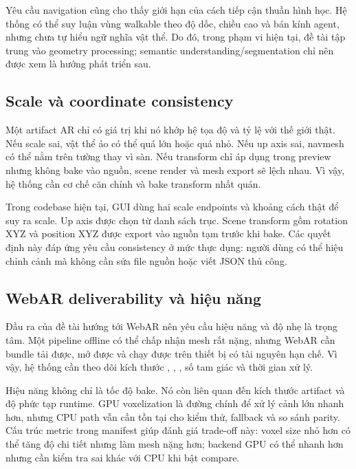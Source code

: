 Yêu cầu navigation cũng cho thấy giới hạn của cách tiếp cận thuần hình học. Hệ thống có thể suy luận vùng walkable theo độ dốc, chiều cao và bán kính agent, nhưng chưa tự hiểu ngữ nghĩa vật thể. Do đó, trong phạm vi hiện tại, đề tài tập trung vào geometry processing; semantic understanding/segmentation chỉ nên được xem là hướng phát triển sau.

\subsection{Scale và coordinate consistency}

Một artifact AR chỉ có giá trị khi nó khớp hệ tọa độ và tỷ lệ với thế giới thật. Nếu scale sai, vật thể ảo có thể quá lớn hoặc quá nhỏ. Nếu up axis sai, navmesh có thể nằm trên tường thay vì sàn. Nếu transform chỉ áp dụng trong preview nhưng không bake vào nguồn, scene render và mesh export sẽ lệch nhau. Vì vậy, hệ thống cần cơ chế căn chỉnh và bake transform nhất quán.

Trong codebase hiện tại, GUI dùng hai scale endpoints và khoảng cách thật để suy ra scale. Up axis được chọn từ danh sách trục. Scene transform gồm rotation XYZ và position XYZ được export vào nguồn tạm trước khi bake. Các quyết định này đáp ứng yêu cầu consistency ở mức thực dụng: người dùng có thể hiệu chỉnh cảnh mà không cần sửa file nguồn hoặc viết JSON thủ công.

\subsection{WebAR deliverability và hiệu năng}

Đầu ra của đề tài hướng tới WebAR nên yêu cầu hiệu năng và độ nhẹ là trọng tâm. Một pipeline offline có thể chấp nhận mesh rất nặng, nhưng WebAR cần bundle tải được, mở được và chạy được trên thiết bị có tài nguyên hạn chế. Vì vậy, hệ thống cần theo dõi kích thước , , , số tam giác và thời gian xử lý.

Hiệu năng không chỉ là tốc độ bake. Nó còn liên quan đến kích thước artifact và độ phức tạp runtime. GPU voxelization là đường chính để xử lý cảnh lớn nhanh hơn, nhưng CPU path vẫn cần tồn tại cho kiểm thử, fallback và so sánh parity. Cấu trúc metric trong manifest giúp đánh giá trade-off này: voxel size nhỏ hơn có thể tăng độ chi tiết nhưng làm mesh nặng hơn; backend GPU có thể nhanh hơn nhưng cần kiểm tra sai khác với CPU khi bật compare.

